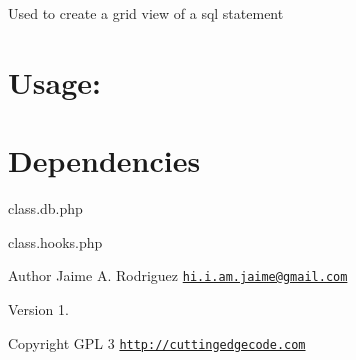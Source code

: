 Used to create a grid view of a sql statement\hypertarget{nav1_usage}{}\section{Usage\-:}\label{nav1_usage}

\hypertarget{ip2country_dependencies}{}\section{Dependencies}\label{ip2country_dependencies}

\begin{DoxyItemize}
\item class.\-db.\-php
\item class.\-hooks.\-php
\end{DoxyItemize}

\begin{DoxyAuthor}{Author}
Jaime A. Rodriguez \href{mailto:hi.i.am.jaime@gmail.com}{\tt hi.\-i.\-am.\-jaime@gmail.\-com} 
\end{DoxyAuthor}
\begin{DoxyVersion}{Version}
1. 
\end{DoxyVersion}
\begin{DoxyCopyright}{Copyright}
G\-P\-L 3 \href{http://cuttingedgecode.com}{\tt http\-://cuttingedgecode.\-com} 
\end{DoxyCopyright}
